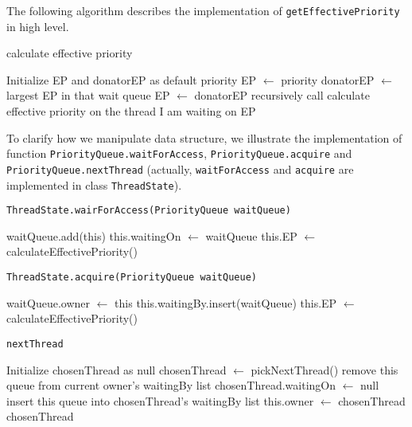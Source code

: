 \documentclass{article}
\begin{document}
\begin{spacing}{1.1}
The following algorithm describes the implementation of \texttt{getEffectivePriority} in high level.

\begin{algorithm}
  \caption{calculate effective priority}
\begin{algorithmic}[1]
  \STATE Initialize EP and donatorEP as default priority
  \STATE EP $\leftarrow$ priority
  \STATE donatorEP $\leftarrow$ largest EP in that wait queue
    \STATE EP $\leftarrow$ donatorEP
  \ENDIF
\ENDFOR
\STATE recursively call calculate effective priority on the thread I am waiting on
\RETURN EP
\end{algorithmic}
\end{algorithm}

To clarify how we manipulate data structure, we illustrate the implementation of function \texttt{PriorityQueue.waitForAccess}, \texttt{PriorityQueue.acquire} and \texttt{PriorityQueue.nextThread} (actually, \texttt{waitForAccess} and \texttt{acquire} are implemented in class \texttt{ThreadState}).

\begin{algorithm}
  \caption{\texttt{ThreadState.wairForAccess(PriorityQueue waitQueue)}}
\begin{algorithmic}[1]
  \STATE waitQueue.add(this)  
  \STATE this.waitingOn $\leftarrow$ waitQueue  
  \STATE this.EP $\leftarrow$ calculateEffectivePriority()  
\RETURN 
\end{algorithmic}
\end{algorithm}

\begin{algorithm}
  \caption{\texttt{ThreadState.acquire(PriorityQueue waitQueue)}}
\begin{algorithmic}[1]
  \STATE waitQueue.owner $\leftarrow$ this
  \STATE this.waitingBy.insert(waitQueue)
  \STATE this.EP $\leftarrow$ calculateEffectivePriority()  
\RETURN 
\end{algorithmic}
\end{algorithm}

\begin{algorithm}
  \caption{\texttt{nextThread}}
\begin{algorithmic}[1]
  \STATE Initialize chosenThread as null
  \STATE chosenThread $\leftarrow$ pickNextThread()
    \STATE remove this queue from current owner's waitingBy list
    \STATE chosenThread.waitingOn $\leftarrow$ null
    \STATE insert this queue into chosenThread's waitingBy list
  \ENDIF
  \STATE this.owner $\leftarrow$ chosenThread
\RETURN chosenThread
\end{algorithmic}
\end{algorithm}


\end{spacing}
\end{document}
